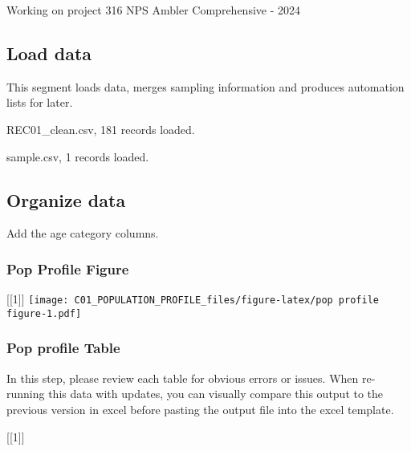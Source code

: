 \documentclass[
]{article}
\begin{document}
Working on project 316 NPS Ambler Comprehensive - 2024

\subsection{Load data}\label{load-data}

This segment loads data, merges sampling information and produces
automation lists for later.

REC01\_clean.csv, 181 records loaded.

sample.csv, 1 records loaded.

\subsection{Organize data}\label{organize-data}

Add the age category columns.

\subsubsection{Pop Profile Figure}\label{pop-profile-figure}

{[}{[}1{]}{]}
\texttt{[image: C01\_POPULATION\_PROFILE\_files/figure-latex/pop profile figure-1.pdf]}

\subsubsection{Pop profile Table}\label{pop-profile-table}

In this step, please review each table for obvious errors or issues.
When re-running this data with updates, you can visually compare this
output to the previous version in excel before pasting the output file
into the excel template.

{[}{[}1{]}{]}
\end{document}
